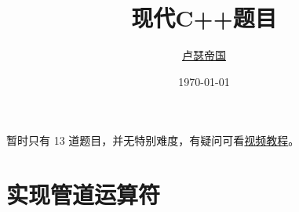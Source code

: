 \documentclass[11pt,fancyhdr]{ctexart}
\title{现代C++题目}
\author{\href{https://github.com/Mq-b/Loser-HomeWork}{卢瑟帝国}\\}
\date{\today}
\begin{document}
\maketitle

暂时只有 13 道题目，并无特别难度，有疑问可看\href{https://www.bilibili.com/video/BV1Zj411r7eP/}{视频教程}。

\section{实现管道运算符}


\end{document}
